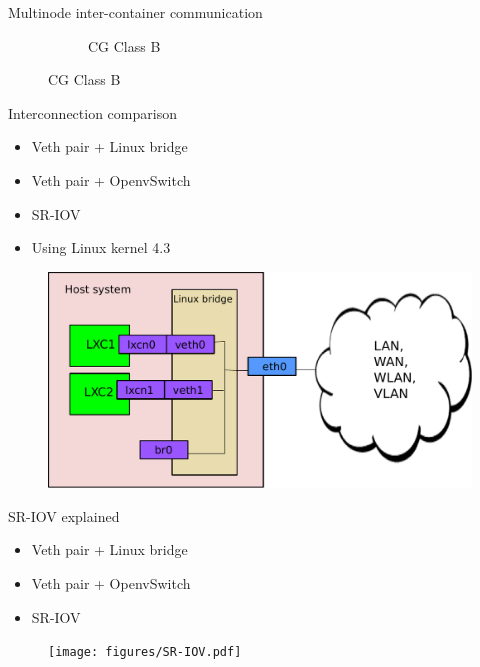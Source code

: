 \documentclass[11pt,xcolor=dvipsnames,presentation]{beamer}
\begin{document}
\begin{frame}[label=sec-4-0-7]{Multinode inter-container communication}
\begin{figure}
\begin{subfigure}[b]{0.42\textwidth}
    \caption{CG Class B}
  \end{subfigure}
\end{figure}
\end{frame}

\begin{frame}[label=sec-4-0-8]{Interconnection comparison}
\begin{itemize}
\item \alert{Veth pair + Linux bridge}
\item \alert{Veth pair + OpenvSwitch}
\item \alert{SR-IOV}
\item Using Linux kernel 4.3
\end{itemize}

\begin{figure}[!h]
  \center
  \includegraphics[scale=0.4]{figures/lxc-veth.pdf}
  \label{fig:hpc}
\end{figure}
\end{frame}

\begin{frame}[label=sec-4-0-9]{SR-IOV explained}
\begin{itemize}
\item \alert{Veth pair + Linux bridge}
\item \alert{Veth pair + OpenvSwitch}
\item \alert{SR-IOV}
\end{itemize}

\begin{figure}[!h]
  \center
  \texttt{[image: figures/SR-IOV.pdf]}
\end{figure}
\end{frame}
\end{document}
